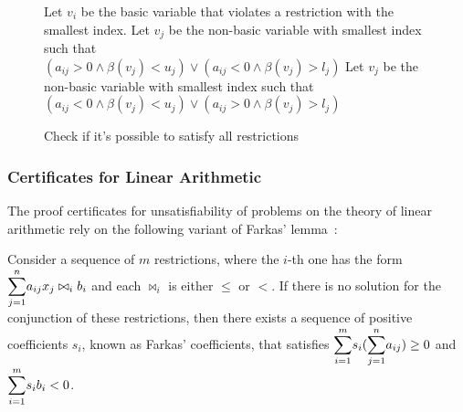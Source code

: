 \begin{figure}[t]
\begin{algorithmic}[1]
    \State Let $v_{i}$ be the basic variable that violates a restriction with the smallest index.
      \State {}
    \EndIf
      \State Let $v_{j}$ be the non-basic variable with smallest index such that\\
      \qquad \qquad $(a_{ij} > 0 \wedge \beta(v_{j}) < u_{j}) \vee (a_{ij} < 0 \wedge \beta(v_{j}) > l_{j})$
        \State {}
      \EndIf
      \State {}
        \State Let $v_{j}$ be the non-basic variable with smallest index such that\\
        \qquad \qquad $(a_{ij} < 0 \wedge \beta(v_{j}) < u_{j}) \vee (a_{ij} > 0 \wedge \beta(v_{j}) > l_{j})$
          \State {}
        \EndIf
        \State {}
    \EndIf
    \State {}
  \EndFunction

\end{algorithmic}
\caption{Check if it's possible to satisfy all restrictions}\label{check_lra}
\end{figure}

\subsubsection{Certificates for Linear Arithmetic}\label{sec:liaCert}

The proof certificates for unsatisfiability of problems on the theory of linear arithmetic rely on the following variant of Farkas' lemma~\cite{farkas_ref}:

\begin{theorem}\label{farkas_lemma}
  Consider a sequence of $m$ restrictions, where the $i$-th one has the form $\mathlarger{\sum}_{j = 1}^{n} a_{ij} x_{j} \bowtie_{i} b_{i}$ and each $\bowtie_{i}$ is either $\le$ or $<$. If there is no solution for the conjunction of these restrictions, then there exists a sequence of positive coefficients $s_{i}$, known as Farkas' coefficients, that satisfies $\mathlarger{\sum}_{i = 1}^{m} s_{i} (\mathlarger{\sum}_{j = 1}^{n} a_{ij}) \ge 0$ and $\mathlarger{\sum}_{i = 1}^{m} s_{i} b_{i} < 0$.
\end{theorem}

